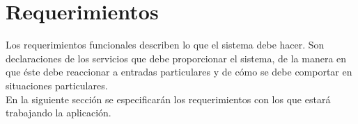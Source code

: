 \section{Requerimientos}
Los requerimientos funcionales describen lo que el sistema debe hacer. Son declaraciones de los servicios que debe proporcionar el sistema, de la manera en que éste debe reaccionar a entradas particulares y de cómo se debe comportar en situaciones particulares.\\
En la siguiente sección se especificarán los requerimientos con los que estará trabajando la aplicación.\\
%		
%		
%		
%		 
%		 
%	
%		
%		
%		
